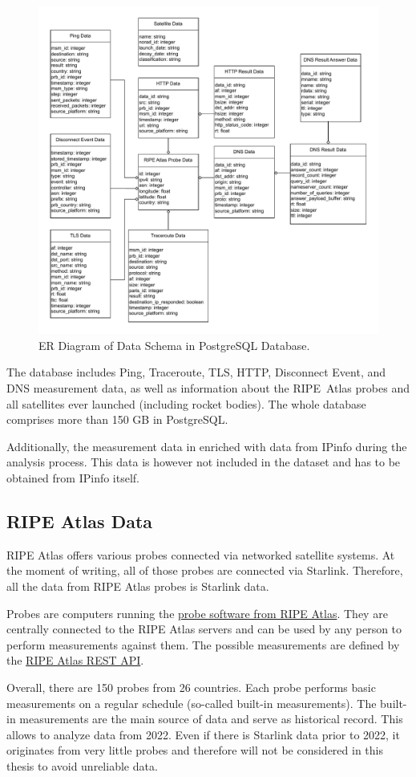 \begin{figure}
	\includegraphics[width=\textwidth]{./chapters/3-methodology/img/er-diagram.drawio.pdf}
	\caption{ER Diagram of Data Schema in PostgreSQL Database.}
	\label{fig:er-diagram}
\end{figure}

The database includes Ping, Traceroute, TLS, HTTP, Disconnect Event, and DNS
measurement data, as well as information about the RIPE~Atlas probes and all
satellites ever launched (including rocket bodies). The whole database
comprises more than 150 GB in PostgreSQL.

Additionally, the measurement data in enriched with data from IPinfo during the
analysis process. This data is however not included in the dataset and has to
be obtained from IPinfo itself.

\subsection*{RIPE Atlas Data}

RIPE Atlas offers various probes connected via networked satellite systems. At
the moment of writing, all of those probes are connected via Starlink.
Therefore, all the data from RIPE Atlas probes is Starlink data.

Probes are computers running the
\href{https://github.com/RIPE-NCC/ripe-atlas-software-probe}{probe software
	from RIPE Atlas}. They are centrally connected to the RIPE Atlas
servers and
can be used by any person to perform measurements against them. The possible
measurements are defined by the
\href{https://atlas.ripe.net/docs/apis/rest-api-reference/}{RIPE Atlas REST
	API}.

Overall, there are 150 probes from 26 countries. Each probe performs basic
measurements on a regular schedule (so-called built-in measurements). The
built-in measurements are the main source of data and serve as historical
record. This allows to analyze data from 2022. Even if there is Starlink data
prior to 2022, it originates from very little probes and therefore will not be
considered in this thesis to avoid unreliable data.
